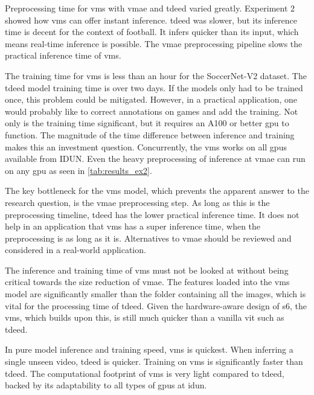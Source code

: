 Preprocessing time for \acrshort{vms} with \acrshort{vmae} and \acrshort{tdeed} varied greatly. Experiment 2 showed how \acrshort{vms} can offer instant inference. \acrshort{tdeed} was slower, but its inference time is decent for the context of football. It infers quicker than its input, which means real-time inference is possible. The \acrshort{vmae} preprocessing pipeline slows the practical inference time of \acrshort{vms}. 

The training time for \acrshort{vms} is less than an hour for the SoccerNet-V2 dataset. The \acrshort{tdeed} model training time is over two days. If the models only had to be trained once, this problem could be mitigated. However, in a practical application, one would probably like to correct annotations on games and add the training. Not only is the training time significant, but it requires an A100 or better \acrshort{gpu} to function. The magnitude of the time difference between inference and training makes this an investment question. Concurrently, the \acrshort{vms} works on all \acrshort{gpu}s available from IDUN. Even the heavy preprocessing of inference at \acrshort{vmae} can run on any \acrshort{gpu} as seen in \cref{tab:results_ex2}.

The key bottleneck for the \acrshort{vms} model, which prevents the apparent answer to the research question, is the \acrshort{vmae} preprocessing step. As long as this is the preprocessing timeline, \acrshort{tdeed} has the lower practical inference time. It does not help in an application that \acrshort{vms} has a super inference time, when the preprocessing is as long as it is. Alternatives to \acrshort{vmae} should be reviewed and considered in a real-world application. 

The inference and training time of \acrshort{vms} must not be looked at without being critical towards the size reduction of \acrshort{vmae}. The features loaded into the \acrshort{vms} model are significantly smaller than the folder containing all the images, which is vital for the processing time of \acrshort{tdeed}. Given the hardware-aware design of \acrfull{s6}, the \acrshort{vms}, which builds upon this, is still much quicker than a vanilla \acrfull{vit} such as \acrshort{tdeed}.

In pure model inference and training speed, \acrshort{vms} is quickest. When inferring a single unseen video, \acrshort{tdeed} is quicker. Training on \acrshort{vms} is significantly faster than \acrshort{tdeed}. The computational footprint of \acrshort{vms} is very light compared to \acrshort{tdeed}, backed by its adaptability to all types of \acrshort{gpu}s at \acrshort{idun}. 


